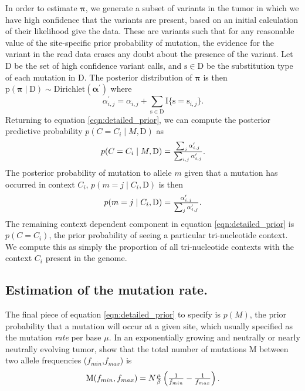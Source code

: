 \documentclass[a4,center,fleqn]{NAR}
\begin{document}
In order to estimate $\boldsymbol{\pi}$, we generate a subset of variants in the tumor in which we have high confidence that the variants are present, based on an initial calculation of their likelihood give the data.
These are variants such that for any reasonable value of the site-specific prior probability of mutation, the evidence for the variant in the read data erases any doubt about the presence of the variant. 
Let $\mathrm{D}$ be the set of high confidence variant calls, and $\mathrm{s} \in \mathrm{D}$ be the substitution type of each mutation in $\mathrm{D}$.
The posterior distribution of $\boldsymbol{\pi}$ is then $\mathrm{p}(\boldsymbol{\pi} \mid \mathrm{D}) \sim \textrm{Dirichlet}(\boldsymbol{\alpha^{\prime}})$ where
  $$
    \alpha^{\prime}_{i,j} = \alpha_{i,j} + \sum\limits_{\mathrm{s} \in \mathrm{D}} \mathrm{I}\{\mathrm{s} = \mathrm{s}_{i,j}\}.
  $$
Returning to equation \ref{eqn:detailed_prior}, we can compute the posterior predictive probability $p(C = C_{i} \mid M,\mathrm{D})$ as
\begin{equation}
  \label{eqn:post_pred}
  $$
  p(C = C_{i} \mid M,\mathrm{D}) = \frac{\sum_{j}\alpha^{\prime}_{i,j}}{\sum_{i,j}\alpha^{\prime}_{i,j}}.
  $$
\end{equation}
The posterior probability of mutation to allele $m$ given that a mutation has occurred in context $C_{i}$, $p(m = j \mid C_{i},\mathrm{D})$ is then
\begin{equation}
  \label{eqn:to_allele}
  $$
   p(m = j \mid C_{i},\mathrm{D}) = \frac{\alpha^{\prime}_{i,j}}{\sum_{j} \alpha^{\prime}_{i,j}}.
  $$
\end{equation}
The remaining context dependent component in equation \ref{eqn:detailed_prior} is $p(C = C_{i})$, the prior probability of seeing a particular tri-nucleotide context.
We compute this as simply the proportion of all tri-nucleotide contexts with the context $C_{i}$ present in the genome.


\subsection{Estimation of the mutation rate.}
The final piece of equation \ref{eqn:detailed_prior} to specify is $p(M)$, the prior probability that a mutation will occur at a given site, which usually specified as the mutation \textit{rate} per base $\mu$.
In an exponentially growing and neutrally or nearly neutrally evolving tumor, \citet{Williams2018} show that the total number of mutations $\mathrm{M}$ between two allele frequencies ($f_{min}$,$f_{max}$) is
\begin{equation}
  \label{eqn:mut_rate}
$$
  \mathrm{M}(f_{min},f_{max}) = N\frac{\mu}{\beta}\left(\frac{1}{f_{min}} - \frac{1}{f_{max}}\right).
$$
\end{equation}
\end{document}
